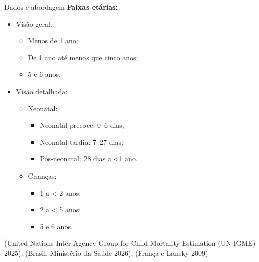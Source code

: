 \documentclass[
  ignorenonframetext,
  brazilian,
]{beamer}
\providecommand{\tightlist}{%
  \setlength{\itemsep}{0pt}\setlength{\parskip}{0pt}}
\begin{document}
\begin{frame}{Dados e abordagem}
\protect{}\label{dados-e-abordagem-1}
\textbf{Faixas etárias:}\\

\begin{itemize}
\tightlist
\item
  Visão geral:\\

  \begin{itemize}
  \tightlist
  \item
    Menos de 1 ano;\\
  \item
    De 1 ano até menos que cinco anos;\\
  \item
    5 e 6 anos.\\
  \end{itemize}
\item
  Visão detalhada:\\

  \begin{itemize}
  \tightlist
  \item
    Neonatal:\\

    \begin{itemize}
    \tightlist
    \item
      Neonatal precoce: 0--6 dias;\\
    \item
      Neonatal tardia: 7--27 dias;\\
    \item
      Pós-neonatal: 28 dias a \textless1 ano.\\
    \end{itemize}
  \item
    Crianças:\\

    \begin{itemize}
    \tightlist
    \item
      1 a \textless{} 2 anos;\\
    \item
      2 a \textless{} 5 anos;\\
    \item
      5 e 6 anos.
    \end{itemize}
  \end{itemize}
\end{itemize}

(United Nations Inter-Agency Group for Child Mortality Estimation (UN
IGME) 2025), (Brasil. Ministério da Saúde 2026), (França e Lansky 2009)
\end{frame}
\end{document}

